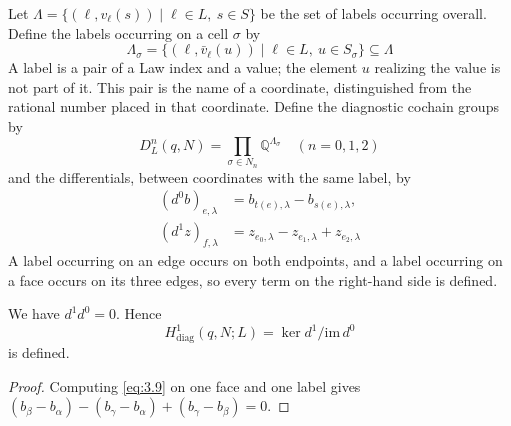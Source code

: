\begin{construction}\label{cons:3.10}

Let $\Lambda=\{(\ell,v_\ell(s))\mid\ell\in L,\ s\in S\}$ be the set of labels
occurring overall.
Define the labels occurring on a cell $\sigma$ by
\begin{equation*}
\Lambda_\sigma
=\{(\ell,\bar v_\ell(u))\mid \ell\in L,\ u\in S_\sigma\}
\subseteq\Lambda
\tag{3.7}\label{eq:3.7}
\end{equation*}
A label is a pair of a Law index and a value; the element $u$ realizing the value is
not part of it. This pair is the name of a coordinate, distinguished from the rational
number placed in that coordinate.
Define the diagnostic cochain groups by
\begin{equation*}
D_L^n(q,N)=\prod_{\sigma\in N_n}\mathbb{Q}^{\Lambda_\sigma}
\quad(n=0,1,2)
\tag{3.8}\label{eq:3.8}
\end{equation*}
and the differentials, between coordinates with the same label, by
\begin{equation*}
\begin{aligned}
(d^0b)_{e,\lambda}
&=b_{t(e),\lambda}-b_{s(e),\lambda},\\
(d^1z)_{f,\lambda}
&=z_{e_0,\lambda}-z_{e_1,\lambda}+z_{e_2,\lambda}
\end{aligned}
\tag{3.9}\label{eq:3.9}
\end{equation*}
A label occurring on an edge occurs on both endpoints, and a label occurring on a face
occurs on its three edges, so every term on the right-hand side is defined.

\end{construction}

\begin{lemma}\label{lem:3.11}

We have $d^1d^0=0$. Hence
\begin{equation*}
H^1_{\mathrm{diag}}(q,N;L)
=\ker d^1/\mathrm{im}\,d^0
\tag{3.10}\label{eq:3.10}
\end{equation*}
is defined.

\end{lemma}

\begin{proof}

Computing \eqref{eq:3.9} on one face and one label gives
$(b_\beta-b_\alpha)-(b_\gamma-b_\alpha)+(b_\gamma-b_\beta)=0$.

\end{proof}

